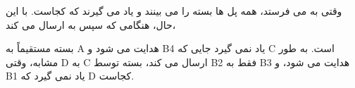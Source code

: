 \begin{boxK}
    وقتی 
    به 
    می فرستد،
  همه پل ها بسته را می بینند و یاد می گیرند که 
  کجاست. با این حال،
هنگامی که 
سپس به
ارسال می کند،

بسته مستقیماً به A هدایت می شود و B4 یاد نمی گیرد
جایی که C است.
به طور مشابه، وقتی D به C ارسال می کند،
بسته توسط B2 فقط به B3 هدایت می شود،
  و B1 یاد نمی گیرد که D کجاست.


\newline


\newline


\newline


\newline


\end{boxK}